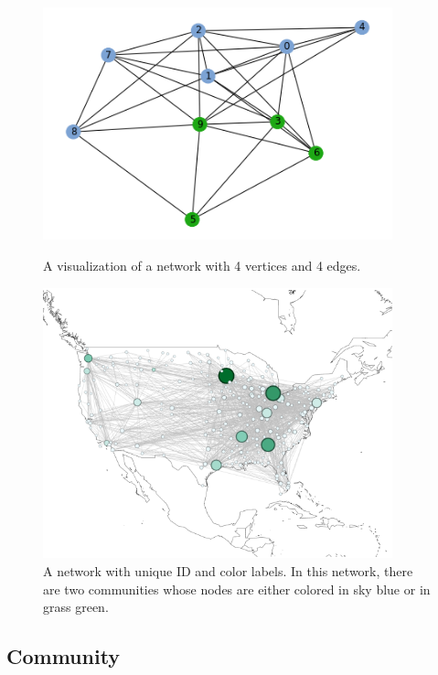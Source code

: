 \documentclass[12pt]{article}
\begin{document}
\bigbreak
\begin{figure}
    \centering
    \begin{minipage}{0.45\textwidth}
        \centering
        \includegraphics[width=0.9\textwidth]{fig_1.png} %
        \caption{\label{fig:fig_1} A visualization of a network with 4 vertices and 4 edges.}
    \end{minipage}\hfill
    \begin{minipage}{0.45\textwidth}
        \centering
        \includegraphics[width=0.9\textwidth]{fig_2.png} %
        \caption{\label{fig:fig_2}A network with unique ID and color labels. In this network, there are two communities whose nodes are either colored in sky blue or in grass green.}
    \end{minipage}
\end{figure}


\subsection{Community}
\end{document}
